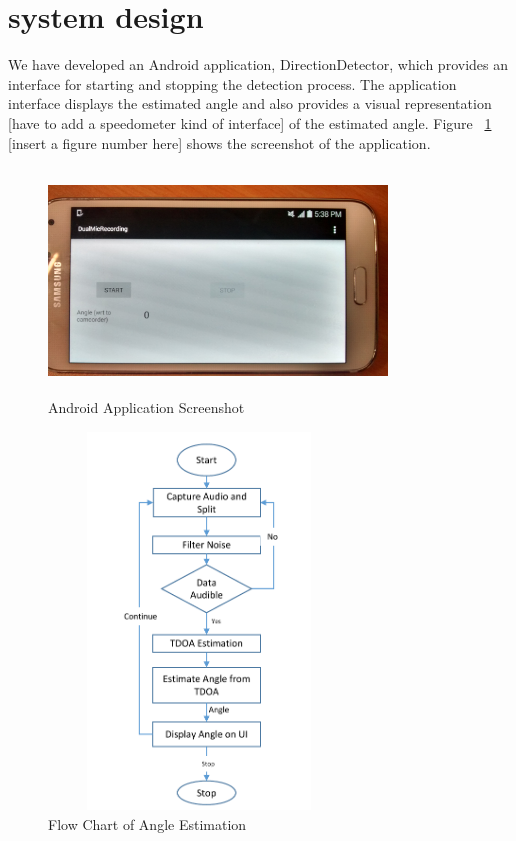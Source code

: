 \section{system design}
We have developed an Android application, DirectionDetector, which provides an interface for starting and stopping the detection process. The application interface displays the estimated angle and also provides a visual representation [have to add a speedometer kind of interface] of the estimated angle. Figure ~\ref{fig:screenshot} [insert a figure number here] shows the screenshot of the application.

\begin{figure}
\includegraphics[width=90mm, height=60mm]{figures/screenshot.jpg}
\caption{Android Application Screenshot}
\label{fig:screenshot}
\end{figure}


\begin{figure}
\includegraphics[width=80mm, height=100mm]{figures/flowchart.pdf}
%
\caption{Flow Chart of Angle Estimation}
\label{fig:flowChart}
\end{figure}

